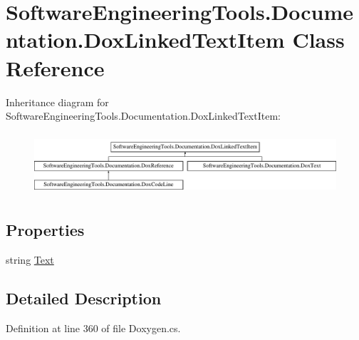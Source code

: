 \hypertarget{class_software_engineering_tools_1_1_documentation_1_1_dox_linked_text_item}{\section{Software\+Engineering\+Tools.\+Documentation.\+Dox\+Linked\+Text\+Item Class Reference}
\label{class_software_engineering_tools_1_1_documentation_1_1_dox_linked_text_item}
}
Inheritance diagram for Software\+Engineering\+Tools.\+Documentation.\+Dox\+Linked\+Text\+Item\+:\begin{figure}[H]
\begin{center}
\leavevmode
\includegraphics[height=2.314050cm]{class_software_engineering_tools_1_1_documentation_1_1_dox_linked_text_item}
\end{center}
\end{figure}
\subsection*{Properties}
\begin{DoxyCompactItemize}
\item 
string \hyperlink{class_software_engineering_tools_1_1_documentation_1_1_dox_linked_text_item_a2bb49a433d3cd0bae57d844da0743c7e}{Text}
\end{DoxyCompactItemize}


\subsection{Detailed Description}


Definition at line 360 of file Doxygen.\+cs.



